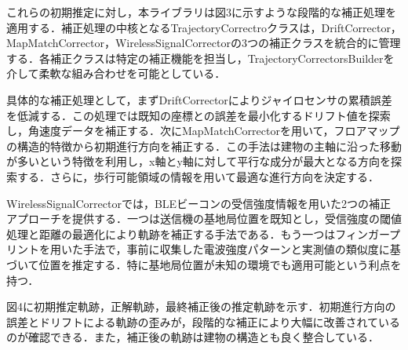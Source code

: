 \documentclass[a4paper, 10pt, twocolumn]{jarticle}
\begin{document}
これらの初期推定に対し，本ライブラリは図3に示すような段階的な補正処理を適用する．補正処理の中核となるTrajectoryCorrectroクラスは，DriftCorrector，MapMatchCorrector，WirelessSignalCorrectorの3つの補正クラスを統合的に管理する．各補正クラスは特定の補正機能を担当し，TrajectoryCorrectorsBuilderを介して柔軟な組み合わせを可能としている．

具体的な補正処理として，まずDriftCorrectorによりジャイロセンサの累積誤差を低減する．この処理では既知の座標との誤差を最小化するドリフト値を探索し，角速度データを補正する．次にMapMatchCorrectorを用いて，フロアマップの構造的特徴から初期進行方向を補正する．この手法は建物の主軸に沿った移動が多いという特徴を利用し，x軸とy軸に対して平行な成分が最大となる方向を探索する．さらに，歩行可能領域の情報を用いて最適な進行方向を決定する．

WirelessSignalCorrectorでは，BLEビーコンの受信強度情報を用いた2つの補正アプローチを提供する．一つは送信機の基地局位置を既知とし，受信強度の閾値処理と距離の最適化により軌跡を補正する手法である．もう一つはフィンガープリントを用いた手法で，事前に収集した電波強度パターンと実測値の類似度に基づいて位置を推定する．特に基地局位置が未知の環境でも適用可能という利点を持つ．

図4に初期推定軌跡，正解軌跡，最終補正後の推定軌跡を示す．初期進行方向の誤差とドリフトによる軌跡の歪みが，段階的な補正により大幅に改善されているのが確認できる．また，補正後の軌跡は建物の構造とも良く整合している．
\end{document}
